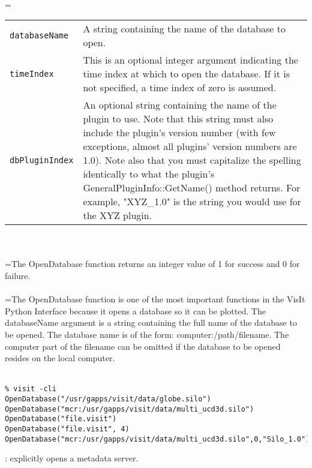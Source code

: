 \documentclass[10pt,a4paper]{report}
\begin{document}
 \\ 
\hangindent=\parindent 
\begin{tabular}{lp{9cm}}
\verb!databaseName! & A string containing the name of the database to open. \\
\verb!timeIndex! & This is an optional integer argument indicating the time index at which to open the database. If it is not specified, a time index of zero is assumed. \\
\verb!dbPluginIndex! & An optional string containing the name of the plugin to use. Note that this string must also include the plugin's version number (with few exceptions, almost all plugins' version numbers are 1.0). Note also that you must capitalize the spelling identically to what the plugin's GeneralPluginInfo::GetName() method returns. For example, "XYZ\_1.0" is the string you would use for the XYZ plugin. \\
\end{tabular} \\[-2mm]


 \\ 
\hangindent=\parindent The OpenDatabase function returns an integer value of 1 for success and 0 for failure. \\[-3mm] 

 \\ 
\hangindent=\parindent The OpenDatabase function is one of the most important functions in the VisIt Python Interface because it opens a database so it can be plotted. The databaseName argument is a string containing the full name of the database to be opened. The database name is of the form: computer:/path/filename. The computer part of the filename can be omitted if the database to be opened resides on the local computer. \\[-3mm] 

\\[-6mm]
\begin{verbatim}% visit -cli
OpenDatabase("/usr/gapps/visit/data/globe.silo")
OpenDatabase("mcr:/usr/gapps/visit/data/multi_ucd3d.silo")
OpenDatabase("file.visit")
OpenDatabase("file.visit", 4)
OpenDatabase("mcr:/usr/gapps/visit/data/multi_ucd3d.silo",0,"Silo_1.0")
\end{verbatim}
\newpage


{}
: explicitly opens a metadata server.\\[-3mm]
\end{document}
